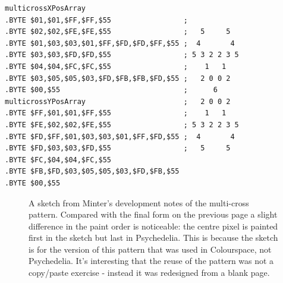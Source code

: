 \begin{minipage}[b]{0.48\linewidth}
\begin{lrbox}{\mybox}%
\begin{lstlisting}[basicstyle=\ttfamily\tiny]
multicrossXPosArray 
.BYTE $01,$01,$FF,$FF,$55                 ;
.BYTE $02,$02,$FE,$FE,$55                 ;   5     5  
.BYTE $01,$03,$03,$01,$FF,$FD,$FD,$FF,$55 ;  4       4 
.BYTE $03,$03,$FD,$FD,$55                 ; 5 3 2 2 3 5
.BYTE $04,$04,$FC,$FC,$55                 ;    1   1   
.BYTE $03,$05,$05,$03,$FD,$FB,$FB,$FD,$55 ;   2 0 0 2  
.BYTE $00,$55                             ;      6     
multicrossYPosArray                       ;   2 0 0 2  
.BYTE $FF,$01,$01,$FF,$55                 ;    1   1   
.BYTE $FE,$02,$02,$FE,$55                 ; 5 3 2 2 3 5
.BYTE $FD,$FF,$01,$03,$03,$01,$FF,$FD,$55 ;  4       4 
.BYTE $FD,$03,$03,$FD,$55                 ;   5     5  
.BYTE $FC,$04,$04,$FC,$55                 
.BYTE $FB,$FD,$03,$05,$05,$03,$FD,$FB,$55 
.BYTE $00,$55
\end{lstlisting}
\end{lrbox}%
\scalebox{0.8}{\usebox{\mybox}}

\end{minipage}
\clearpage
\begin{figure}[H]
    \centering
    \begin{adjustbox}{width=7cm,center}
    \end{adjustbox}
\caption{
  A sketch from Minter's development notes of the multi-cross pattern. Compared with the final form on the previous page
  a slight difference in the paint order is noticeable: the centre pixel is painted first in the sketch but last in Psychedelia.
  This is because the sketch is for the version of this pattern that was used in Colourspace, not Psychedelia. It's interesting
  that the reuse of the pattern was not a copy/paste exercise - instead it was redesigned from a blank page.
  }
\end{figure}
